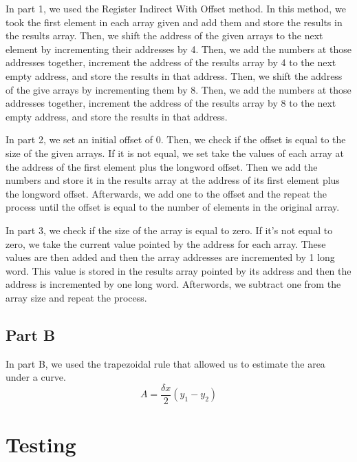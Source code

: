 \documentclass[10pt, letterpaper, titlepage]{article} %
\begin{document}
\begin{multicols*}{2}
In part 1, we used the Register Indirect With Offset method. 
In this method, we took the first element in each array given and add them and store the results in the results array. 
Then, we shift the address of the given arrays to the next element by incrementing their addresses by 4. 
Then, we add the numbers at those addresses together, increment the address of the results array by 4 to the next empty address, and store the results in that address. 
Then, we shift the address of the give arrays by incrementing them by 8. 
Then, we add the numbers at those addresses together, increment the address of the results array by 8 to the next empty address, and store the results in that address.

In part 2, we set an initial offset of 0.
Then, we check if the offset is equal to the size of the given arrays. 
If it is not equal, we set take the values of each array at the address of the first element plus the longword offset. 
Then we add the numbers and store it in the results array at the address of its first element plus the longword offset.
Afterwards, we add one to the offset and the repeat the process until the offset is equal to the number of elements in the original array.

In part 3, we check if the size of the array is equal to zero. 
If it's not equal to zero, we take the current value pointed by the address for each array. 
These values are then added and then the array addresses are incremented by 1 long word. 
This value is stored in the results array pointed by its address and then the address is incremented by one long word.
Afterwords, we subtract one from the array size and repeat the process.

\subsection{Part B}
In part B, we used the trapezoidal rule that allowed us to estimate the area under a curve.
\begin{equation*}
A = \frac{\delta x}{2} (y_1 - y_2)
\end{equation*}


\section{Testing}

\end{multicols*}
\end{document}
